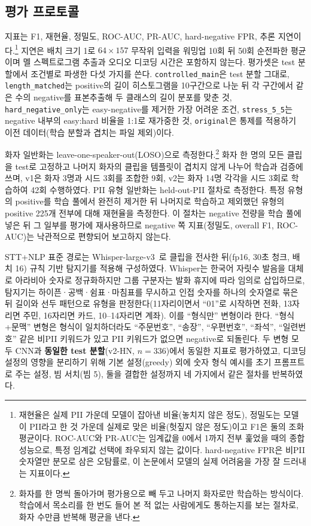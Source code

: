 \documentclass[10pt,twocolumn]{article}
\renewcommand{\emph}[1]{\textbf{#1}}
\begin{document}
\subsection{평가 프로토콜}
지표는 F1, 재현율, 정밀도, ROC-AUC, PR-AUC, hard-negative FPR, 추론
지연이다.\footnote{재현율은 실제 PII 가운데 모델이 잡아낸 비율(놓치지 않은 정도), 정밀도는
모델이 PII라고 한 것 가운데 실제로 맞은 비율(헛짚지 않은 정도)이고 F1은 둘의 조화평균이다.
ROC-AUC와 PR-AUC는 임계값을 0에서 1까지 전부 훑었을 때의 종합 성능으로, 특정 임계값 선택에
좌우되지 않는 값이다. hard-negative FPR은 비PII 숫자열만 분모로 삼은 오탐률로, 이 논문에서
모델의 실제 어려움을 가장 잘 드러내는 지표이다.} 지연은 배치
크기 1로 $64\times157$ 무작위 입력을 워밍업 10회 뒤 50회 순전파한 평균이며 멜 스펙트로그램
추출과 오디오 디코딩 시간은 포함하지 않는다. 평가셋은 test 분할에서 조건별로 파생한 다섯
가지를 쓴다. \texttt{controlled\_main}은 test 분할 그대로, \texttt{length\_matched}는
positive의 길이 히스토그램을 10구간으로 나눈 뒤 각 구간에서 같은 수의 negative를 표본추출해
두 클래스의 길이 분포를 맞춘 것, \texttt{hard\_negative\_only}는 easy-negative를 제거한 가장
어려운 조건, \texttt{stress\_5\_5}는 negative 내부의 easy:hard 비율을 1:1로 재가중한 것,
\texttt{original}은 통제를 적용하기 이전 데이터(학습 분할과 겹치는 파일 제외)이다.

화자 일반화는 leave-one-speaker-out(LOSO)으로 측정한다.\footnote{화자를 한 명씩 돌아가며
평가용으로 빼 두고 나머지 화자로만 학습하는 방식이다. 학습에서 목소리를 한 번도 들어 본 적
없는 사람에게도 통하는지를 보는 절차로, 화자 수만큼 반복해 평균을 낸다.} 화자 한 명의 모든
클립을 test로 고정하고 나머지 화자의 클립을 템플릿이 겹치지 않게 나누어 학습과 검증에 쓰며, v1은 화자 3명과
시드 3회를 조합한 9회, v2는 화자 14명 각각을 시드 3회로 학습하여 42회 수행하였다. PII 유형
일반화는 held-out-PII 절차로 측정한다. 특정 유형의 positive를 학습 풀에서 완전히 제거한 뒤
나머지로 학습하고 제외했던 유형의 positive 225개 전부에 대해 재현율을 측정한다. 이 절차는
negative 전량을 학습 풀에 넣은 뒤 그 일부를 평가에 재사용하므로 negative 쪽 지표(정밀도,
overall F1, ROC-AUC)는 낙관적으로 편향되어 보고하지 않는다.

STT+NLP 표준 경로는 Whisper-large-v3~\cite{radford2023whisper}로 클립을 전사한 뒤(fp16, 30초
청크, 배치 16) 규칙 기반 탐지기를 적용해 구성하였다. Whisper는 한국어 자릿수 발음을 대체로
아라비아 숫자로 정규화하지만 그룹 구분자는 발화 휴지에 따라 임의로 삽입하므로, 탐지기는
하이픈·공백·쉼표·마침표를 무시하고 인접 숫자를 하나의 숫자열로 묶은 뒤 길이와 선두 패턴으로
유형을 판정한다(11자리이면서 ``01''로 시작하면 전화, 13자리면 주민, 16자리면 카드, 10--14자리면
계좌). 이를 ``형식만'' 변형이라 한다. ``형식+문맥'' 변형은 형식이 일치하더라도 ``주문번호'',
``송장'', ``우편번호'', ``좌석'', ``일련번호'' 같은 비PII 키워드가 있고 PII 키워드가 없으면
negative로 되돌린다. 두 변형 모두 CNN과 \emph{동일한 test 분할}(v2-HN, $n=336$)에서 동일한
지표로 평가하였고, 디코딩 설정의 영향을 분리하기 위해 기본 설정(greedy) 외에 숫자 형식 예시를
초기 프롬프트로 주는 설정, 빔 서치(빔 5), 둘을 결합한 설정까지 네 가지에서 같은 절차를
반복하였다.
\end{document}
